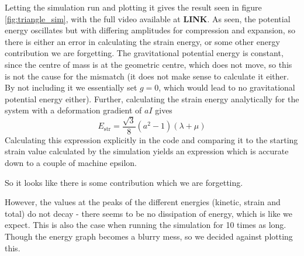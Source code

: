 \documentclass[sigconf]{acmart}
\begin{document}
Letting the simulation run and plotting it gives the result seen in figure \ref{fig:triangle_sim}, with the full video available at \textbf{LINK}. As seen, the potential energy oscillates but with differing amplitudes for compression and expansion, so there is either an error in calculating the strain energy, or some other energy contribution we are forgetting. The gravitational potential energy is constant, since the centre of mass is at the geometric centre, which does not move, so this is not the cause for the mismatch (it does not make sense to calculate it either. By not including it we essentially set $ g=0 $, which would lead to no gravitational potential energy either). Further, calculating the strain energy analytically for the system with a deformation gradient of $ aI $ gives
\begin{equation}\label{key}
	E_{\text{str}} = \frac{\sqrt{3}}{8} (a^2-1) (\lambda+\mu)
\end{equation}
Calculating this expression explicitly in the code and comparing it to the starting strain value calculated by the simulation yields an expression which is accurate down to a couple of machine epsilon.

So it looks like there is some contribution which we are forgetting.

However, the values at the peaks of the different energies (kinetic, strain and total) do not decay - there seems to be no dissipation of energy, which is like we expect. This is also the case when running the simulation for 10 times as long. Though the energy graph becomes a blurry mess, so we decided against plotting this.
\end{document}
